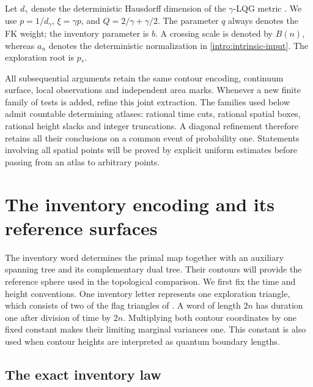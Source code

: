 \documentclass[11pt]{article}
\numberwithin{equation}{section}
\theoremstyle{definition}
\theoremstyle{remark}
\newcommand{\1}{\mathbf 1}
\begin{document}
Let $d_\gamma$ denote the deterministic Hausdorff dimension of the
$\gamma$-LQG metric \citep{GwynneMillerMetric}. We use
$p=1/d_\gamma$, $\xi=\gamma p$, and
$Q=2/\gamma+\gamma/2$. The parameter $q$ always denotes the FK
weight; the inventory parameter is $b$. A crossing scale is denoted
by $B(n)$, whereas $a_n$ denotes the deterministic normalization in
\cref{intro:intrinsic-input}. The exploration root is $p_*$.

All subsequential arguments retain the same contour encoding,
continuum surface, local observations and independent area marks.
Whenever a new finite family of tests is added, refine this joint
extraction. The families used below admit countable determining
atlases: rational time cuts, rational spatial boxes, rational height
slacks and integer truncations. A diagonal refinement therefore
retains all their conclusions on a common event of probability one.
Statements involving all spatial points will be proved by explicit
uniform estimates before passing from an atlas to arbitrary points.

\section{The inventory encoding and its reference surfaces}
\label{enc:section}

The inventory word determines the primal map together with an auxiliary
spanning tree and its complementary dual tree.  Their contours will
provide the reference sphere used in the topological comparison.
We first fix the time and height conventions.  One inventory letter represents
one exploration triangle, which consists of two of the flag triangles
of .  A word of length $2n$ has duration one
after division of time by $2n$.  Multiplying both contour coordinates by one
fixed constant makes their limiting marginal variances one.  This constant is
also used when contour heights are interpreted as quantum boundary lengths.

\subsection{The exact inventory law}
\end{document}
